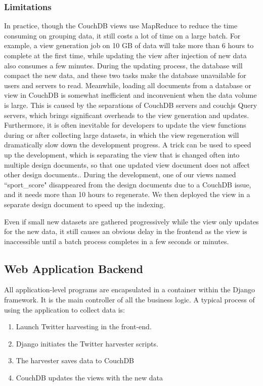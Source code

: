 \subsubsection{Limitations}
In practice, though the CouchDB views use MapReduce to reduce the time consuming on grouping data, it still costs a lot of time on a large batch. For example, a view generation job on 10 GB of data will take more than 6 hours to complete at the first time, while updating the view after injection of new data also consumes a few  minutes. During the updating process, the database will compact the new data, and these two tasks make the database unavailable for users and servers to read. Meanwhile, loading all documents from a database or view in CouchDB is somewhat inefficient and inconvenient when the data volume is large. This is caused by the separations of CouchDB servers and couchjs Query servers, which brings significant overheads to the view generation and updates\cite{cd}. Furthermore, it is often inevitable for developers to update the view functions during or after collecting large datasets, in which the view regeneration will dramatically slow down the development progress. A trick can be used to speed up the development, which is separating the view that is changed often into multiple design documents, so that one updated view document does not affect other design documents.\cite{cd2}. During the development, one of our views named ``sport\_score" disappeared from the design documents due to a CouchDB issue, and it needs more than 10 hours to regenerate. We then deployed the view in a separate design document to speed up the indexing. 

Even if small new datasets are gathered progressively while the view only updates for the new data, it still causes an obvious delay in the frontend as the view is inaccessible until a batch process completes in a few seconds or minutes. 

\subsection{Web Application Backend}

All application-level programs are encapsulated in a container within the Django framework. It is the main controller of all the business logic. A typical process of using the application to collect data is:

\begin{enumerate}
  \item Launch Twitter harvesting in the front-end.
  \item Django initiates the Twitter harvester scripts.
  \item The harvester saves data to CouchDB
  \item CouchDB updates the views with the new data
\end{enumerate}

